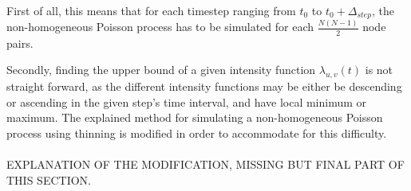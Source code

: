 First of all, this means that for each timestep ranging from $t_0$ to $t_0 + \Delta_{step}$, the non-homogeneous Poisson process has to be simulated for each $\frac{N(N-1)}{2}$ node pairs.

Secondly, finding the upper bound of a given intensity function $\lambda_{u,v}(t)$ is not straight forward, as the different intensity functions may be either be descending or ascending in the given step's time interval, and have local minimum or maximum.
The explained method for simulating a non-homogeneous Poisson process using thinning is modified in order to accommodate for this difficulty.
\\\\
EXPLANATION OF THE MODIFICATION, MISSING BUT FINAL PART OF THIS SECTION.